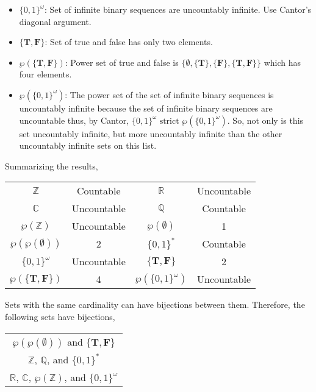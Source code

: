 \documentclass{article}
\begin{document}
\begin{itemize}
  \item $\{0,1\}^{\omega}$: Set of infinite binary sequences are uncountably infinite.
  Use Cantor's diagonal argument.

  \item $\{\mathbf{T}, \mathbf{F}\}$: Set of true and false has only two elements.

  \item $\wp(\{\mathbf{T},\mathbf{F}\})$: Power set of true and false is
  $\{\emptyset, \{\mathbf{T}\}, \{\mathbf{F}\}, \{\mathbf{T}, \mathbf{F}\}\}$
  which has four elements.

  \item $\wp(\{0,1\}^{\omega})$: The power set of the set of infinite binary sequences
  is uncountably infinite because the set of infinite binary sequences are
  uncountable thus, by Cantor, $\{0,1\}^{\omega} \textrm{ strict }
  \wp(\{0,1\}^{\omega})$. So, not only is this set uncountably infinite, but more
  uncountably infinite than the other uncountably infinite sets on this list.
\end{itemize}

\bigbreak

Summarizing the results,

\begin{center}
  \begin{tabular}{ c c c c }
    $\mathbb{Z}$ & Countable & $\mathbb{R}$ & Uncountable \\
    $\mathbb{C}$ & Uncountable & $\mathbb{Q}$ & Countable \\
    $\wp(\mathbb{Z})$ & Uncountable & $\wp(\emptyset)$ & 1 \\
    $\wp(\wp(\emptyset))$ & 2 & $\{0,1\}^{*}$ & Countable \\
    $\{0,1\}^{\omega}$ & Uncountable & $\{\mathbf{T},\mathbf{F}\}$ & 2 \\
    $\wp(\{\mathbf{T},\mathbf{F}\})$ & 4 & $\wp(\{0,1\}^{\omega})$ & Uncountable
  \end{tabular}
\end{center}

Sets with the same cardinality can have bijections between them. Therefore, the
following sets have bijections,

\begin{center}
  \begin{tabular}{ c }
    $\wp(\wp(\emptyset))$ and $\{\mathbf{T},\mathbf{F}\}$ \\
    $\mathbb{Z}$, $\mathbb{Q}$, and $\{0,1\}^{*}$ \\
    $\mathbb{R}$, $\mathbb{C}$, $\wp(\mathbb{Z})$, and $\{0,1\}^{\omega}$
  \end{tabular}
\end{center}
\end{document}
